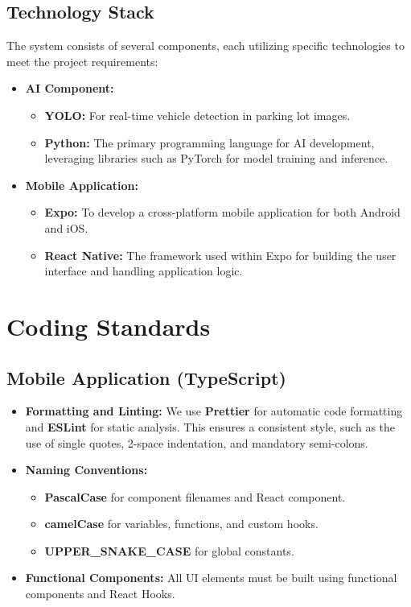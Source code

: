 \subsection{Technology Stack}
\label{subsection:technology-stack}
The system consists of several components, each utilizing specific technologies to meet the project requirements:
\begin{itemize}
    \item \textbf{AI Component:}
    \begin{itemize}
        \item \textbf{YOLO:} For real-time vehicle detection in parking lot images.
        \item \textbf{Python:} The primary programming language for AI development, 
        leveraging libraries such as PyTorch for model training and inference.
    \end{itemize}
    \item \textbf{Mobile Application:}
    \begin{itemize}
        \item \textbf{Expo:} To develop a cross-platform mobile application for both Android and iOS.
        \item \textbf{React Native:} The framework used within Expo for building the user 
        interface and handling application logic.

    \end{itemize}
\end{itemize}

\clearpage

\section{Coding Standards}
\label{section:coding-standards}

\subsection{Mobile Application (TypeScript)}
\begin{itemize}[leftmargin=80pt]
    \item \textbf{Formatting and Linting:} We use \textbf{Prettier} for automatic code formatting and \textbf{ESLint} for static analysis. This ensures a consistent style, such as the use of single quotes, 2-space indentation, and mandatory semi-colons.
    \item \textbf{Naming Conventions:} 
    \begin{itemize}
        \item \textbf{PascalCase} for component filenames and React component.
        \item \textbf{camelCase} for variables, functions, and custom hooks.
        \item \textbf{UPPER\_SNAKE\_CASE} for global constants.
    \end{itemize}
    \item \textbf{Functional Components:} All UI elements must be built using functional components and React Hooks.
\end{itemize}

